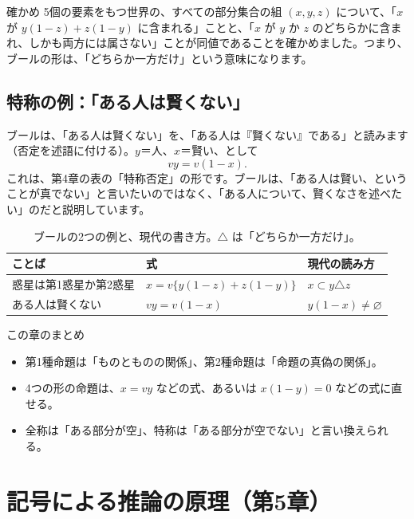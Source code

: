\documentclass[a4paper,11pt,openany]{ltjsbook}
\begin{document}
\begin{examplebox}{確かめ}
5個の要素をもつ世界の、すべての部分集合の組 $(x,y,z)$ について、「$x$ が $y(1-z)+z(1-y)$ に含まれる」ことと、「$x$ が $y$ か $z$ のどちらかに含まれ、しかも両方には属さない」ことが同値であることを確かめました。つまり、ブールの形は、「どちらか一方だけ」という意味になります。
\end{examplebox}

\section{特称の例：「ある人は賢くない」}

ブールは、「ある人は賢くない」を、「ある人は『賢くない』である」と読みます（否定を述語に付ける）。$y$＝人、$x$＝賢い、として
\[
vy=v(1-x).
\]
これは、第4章の表の「特称否定」の形です。ブールは、「ある人は賢い、ということが真でない」と言いたいのではなく、「ある人について、賢くなさを述べたい」のだと説明しています。

\begin{table}[htbp]
\centering
\small
\begin{tabular}{lll}
\toprule
ことば & 式 & 現代の読み方\\
\midrule
惑星は第1惑星か第2惑星 & $x=v\{y(1-z)+z(1-y)\}$ & $x\subset y\triangle z$\\
ある人は賢くない & $vy=v(1-x)$ & $y(1-x)\ne\varnothing$\\
\bottomrule
\end{tabular}
\caption{ブールの2つの例と、現代の書き方。$\triangle$ は「どちらか一方だけ」。}
\end{table}

\begin{pointbox}{この章のまとめ}
\begin{itemize}[leftmargin=*]
\item 第1種命題は「ものとものの関係」、第2種命題は「命題の真偽の関係」。
\item 4つの形の命題は、$x=vy$ などの式、あるいは $x(1-y)=0$ などの式に直せる。
\item 全称は「ある部分が空」、特称は「ある部分が空でない」と言い換えられる。
\end{itemize}
\end{pointbox}

\chapter{記号による推論の原理（第5章）}
\end{document}
